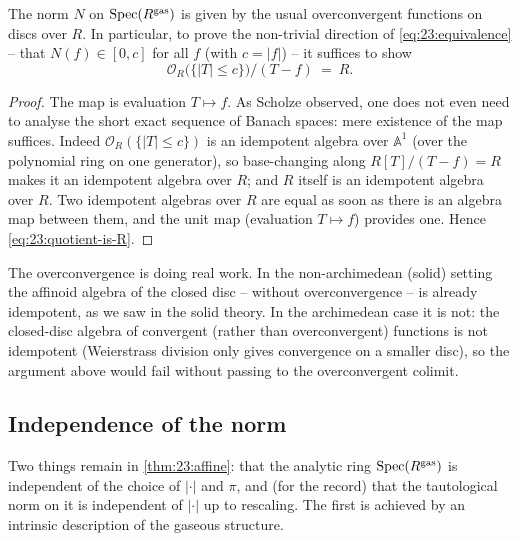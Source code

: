 \begin{proposition}
\label{prop:23:conclusion-norm}
The norm $N$ on $\operatorname{Spec}(R^{\mathrm{gas}})$ is given by the usual
overconvergent functions on discs over $R$. In particular, to prove the
non-trivial direction of \eqref{eq:23:equivalence} -- that
$N(f)\in[0,c]$ for all $f$ (with $c=\lvert f\rvert$) -- it suffices to show
\begin{equation}
\label{eq:23:quotient-is-R}
\mathcal O_R\bigl(\{\lvert T\rvert\le c\}\bigr)\big/(T-f)\ =\ R .
\end{equation}
\end{proposition}

\begin{proof}
The map is evaluation $T\mapsto f$. As Scholze observed, one does not even need
to analyse the short exact sequence of Banach spaces: mere existence of the map
suffices. Indeed $\mathcal O_R(\{\lvert T\rvert\le c\})$ is an idempotent algebra
over $\mathbb A^1$ (over the polynomial ring on one generator), so base-changing
along $R[T]/(T-f)=R$ makes it an idempotent algebra over $R$; and $R$ itself is an
idempotent algebra over $R$. Two idempotent algebras over $R$ are equal as soon
as there is an algebra map between them, and the unit map (evaluation $T\mapsto
f$) provides one. Hence \eqref{eq:23:quotient-is-R}.
\end{proof}

\begin{remark}
\label{rmk:23:overconvergence-essential}
The overconvergence is doing real work. In the non-archimedean (solid) setting
the affinoid algebra of the closed disc -- without overconvergence -- is
already idempotent, as we saw in the solid theory. In the archimedean case it is
not: the closed-disc algebra of convergent (rather than overconvergent) functions
is not idempotent (Weierstrass division only gives convergence on a smaller
disc), so the argument above would fail without passing to the overconvergent
colimit.
\end{remark}

\subsection{Independence of the norm}
\label{subsec:23:independence}

Two things remain in \cref{thm:23:affine}: that the analytic ring
$\operatorname{Spec}(R^{\mathrm{gas}})$ is independent of the choice of $\lvert\cdot\rvert$
and $\pi$, and (for the record) that the tautological norm on it is independent
of $\lvert\cdot\rvert$ up to rescaling. The first is achieved by an intrinsic
description of the gaseous structure.

